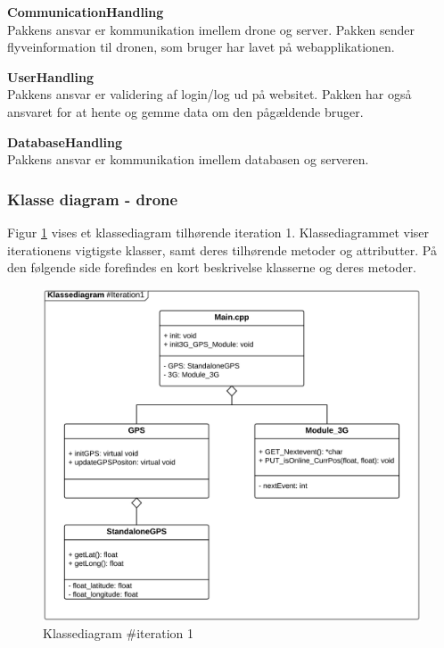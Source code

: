 \textbf{CommunicationHandling}\\
Pakkens ansvar er kommunikation imellem drone og server. Pakken sender flyveinformation til dronen, som bruger har lavet på webapplikationen.

\textbf{UserHandling}\\
Pakkens ansvar er validering af login/log ud på websitet. Pakken har også ansvaret for at hente og gemme data om den pågældende bruger.

\textbf{DatabaseHandling}\\
Pakkens ansvar er kommunikation imellem databasen og serveren. 


\newpage

\subsubsection*{Klasse diagram - drone}
\vspace{-0.2cm}
Figur \ref{fig:classDiagram_iteration1} vises et klassediagram tilhørende iteration 1. Klassediagrammet viser iterationens vigtigste klasser, samt deres tilhørende metoder og attributter. På den følgende side forefindes en kort beskrivelse klasserne og deres metoder.

\vspace{-0.2cm}
\begin{figure}[H]
	\centering
	\includegraphics[width=1\textwidth]{Billeder/klasse_diagrammer/classdiagram_iteration1.png}
	\vspace{-0.5cm}
	\caption{Klassediagram \#iteration 1}
	\label{fig:classDiagram_iteration1}
\end{figure}
\vspace{-0.1cm}

